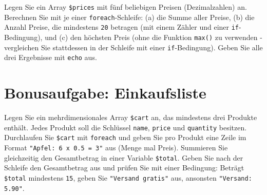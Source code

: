\documentclass[a4paper,12pt]{article}
\begin{document}
Legen Sie ein Array \texttt{\$prices} mit fünf beliebigen Preisen (Dezimalzahlen) an. Berechnen Sie mit je einer \texttt{foreach}-Schleife: (a) die Summe aller Preise, (b) die Anzahl Preise, die mindestens \texttt{20} betragen (mit einem Zähler und einer \texttt{if}-Bedingung), und (c) den höchsten Preis (ohne die Funktion \texttt{max()} zu verwenden - vergleichen Sie stattdessen in der Schleife mit einer \texttt{if}-Bedingung). Geben Sie alle drei Ergebnisse mit \texttt{echo} aus.

\section{Bonusaufgabe: Einkaufsliste}

Legen Sie ein mehrdimensionales Array \texttt{\$cart} an, das mindestens drei Produkte enthält. Jedes Produkt soll die Schlüssel \texttt{name}, \texttt{price} und \texttt{quantity} besitzen. Durchlaufen Sie \texttt{\$cart} mit \texttt{foreach} und geben Sie pro Produkt eine Zeile im Format \texttt{"Apfel: 6 x 0.5 = 3"} aus (Menge mal Preis). Summieren Sie gleichzeitig den Gesamtbetrag in einer Variable \texttt{\$total}. Geben Sie nach der Schleife den Gesamtbetrag aus und prüfen Sie mit einer Bedingung: Beträgt \texttt{\$total} mindestens \texttt{15}, geben Sie \texttt{"Versand gratis"} aus, ansonsten \texttt{"Versand: 5.90"}.
\end{document}
